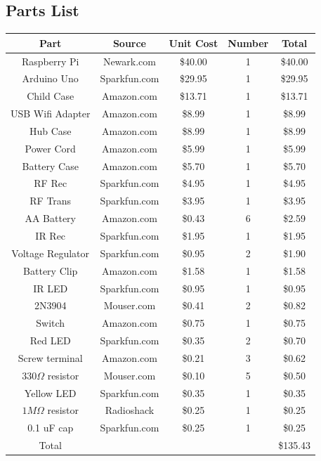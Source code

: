 \documentclass[12pt]{article}
\begin{document}
\subsection*{Parts List}
\begin{table}[htbp]
  \centering
    \begin{tabular}{| c | c | c | c | c |}
    \hline
    Part  & Source & Unit Cost & Number  & Total \\
    \hline
    Raspberry Pi & Newark.com & \$40.00 & 1     & \$40.00 \\
	\hline    
    Arduino Uno & Sparkfun.com & \$29.95 & 1     & \$29.95 \\
    \hline
    Child Case & Amazon.com & \$13.71 & 1     & \$13.71 \\
	\hline
    USB Wifi Adapter & Amazon.com & \$8.99 & 1     & \$8.99 \\
	\hline
    Hub Case & Amazon.com & \$8.99 & 1     & \$8.99 \\
	\hline
    Power Cord & Amazon.com & \$5.99 & 1     & \$5.99 \\
	\hline
    Battery Case & Amazon.com & \$5.70 & 1     & \$5.70 \\
	\hline
    RF Rec & Sparkfun.com & \$4.95 & 1     & \$4.95 \\
	\hline
    RF Trans & Sparkfun.com & \$3.95 & 1     & \$3.95 \\
	\hline
	AA Battery & Amazon.com & \$0.43 & 6     & \$2.59 \\
	\hline
    IR Rec & Sparkfun.com & \$1.95 & 1     & \$1.95 \\
	\hline
	Voltage Regulator & Sparkfun.com & \$0.95 & 2     & \$1.90 \\
	\hline
    Battery Clip & Amazon.com & \$1.58 & 1     & \$1.58 \\
	\hline
	IR LED & Sparkfun.com & \$0.95 & 1     & \$0.95 \\
	\hline
    2N3904 & Mouser.com & \$0.41 & 2     & \$0.82 \\
	\hline
	 Switch & Amazon.com & \$0.75 & 1     & \$0.75 \\
	\hline
    Red LED & Sparkfun.com & \$0.35 & 2     & \$0.70 \\
	\hline
    Screw terminal & Amazon.com & \$0.21 & 3     & \$0.62 \\
    \hline
    $330 \Omega$ resistor & Mouser.com & \$0.10 & 5     & \$0.50 \\
	\hline
    Yellow LED & Sparkfun.com & \$0.35 & 1     & \$0.35 \\
	\hline
    $1 M\Omega$ resistor & Radioshack & \$0.25 & 1     & \$0.25 \\
	\hline
    0.1 uF cap & Sparkfun.com & \$0.25 & 1     & \$0.25 \\
	\hline
    Total &       &       &       & \$135.43 \\
    \hline
    \end{tabular}%
  \label{tab:parts}%
\end{table}%
\end{document}
